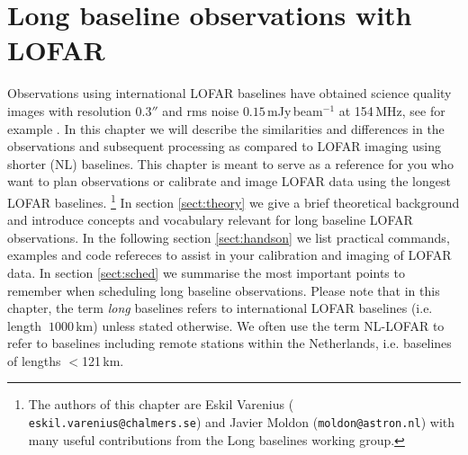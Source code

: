 \chapter{Long baseline observations with LOFAR}
Observations using international LOFAR baselines have obtained science quality
images with resolution 0.3$''$ and rms noise $0.15$\,mJy\,beam$^{-1}$ at
154\,MHz, see for example \cite{varenius2014}. In this chapter we will describe
the similarities and differences in the observations and subsequent processing
as compared to LOFAR imaging using shorter (NL) baselines. This chapter is
meant to serve as a reference for you who want to plan observations or
calibrate and image LOFAR data using the longest LOFAR baselines. 
\footnote{The authors of this chapter are Eskil Varenius ({\tt
eskil.varenius@chalmers.se}) and Javier Moldon ({\tt moldon@astron.nl}) with
many useful contributions from the Long baselines working group.}
In section \ref{sect:theory} we give a brief theoretical background and
introduce concepts and vocabulary relevant for long baseline LOFAR observations. 
In the following section \ref{sect:handson} we list practical commands, examples
and code refereces to assist in your calibration and imaging of LOFAR data. 
In section \ref{sect:sched} we summarise the most important points
to remember when scheduling long baseline observations.
Please note that in this chapter, the term \emph{long} baselines refers to international LOFAR
baselines (i.e. length $~1000$\,km) unless stated otherwise. We often use the term NL-LOFAR
to refer to baselines including remote stations within the Netherlands, i.e. baselines of 
lengths $<$121\,km. 

